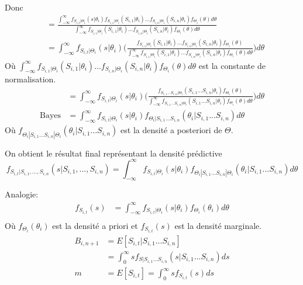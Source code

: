 \documentclass[11pt,french]{report}
\begin{document}
Donc
\begin{align*}
&= \frac{\int_{-\infty}^{\infty} f_{S_{i,t}|\Theta_i}(s|\theta_i)f_{S_{i,1}|\Theta_i}(S_{i,1}|\theta_i)...f_{S_{i,n}|\Theta_i}(S_{i,n}|\theta_i) f_{\Theta_i}(\theta)d\theta}{\int_{-\infty}^{\infty} f_{S_{i,1}|\Theta_i}(S_{i,1}|\theta_i)...f_{S_{i,n}|\Theta_i}(S_{i,n}|\theta_i) f_{\Theta_i}(\theta)d\theta}  \\
&= \int_{-\infty}^{\infty} f_{S_{i,t}|\Theta_i}(s|\theta_i) \Bigg( \frac{f_{S_{i,1}|\Theta_i}(S_{i,1}|\theta_i)...f_{S_{i,n}|\Theta_i}(S_{i,n}|\theta_i) f_{\Theta_i}(\theta)}{\int_{-\infty}^{\infty} f_{S_{i,1}|\Theta_i}(S_{i,1}|\theta_i)...f_{S_{i,n}|\Theta_i}(S_{i,n}|\theta_i) f_{\Theta_i}(\theta)d\theta} \Bigg) d\theta
\end{align*}
Où $\int_{-\infty}^{\infty} f_{S_{i,1}|\Theta_i}(S_{i,1}|\theta_i)...f_{S_{i,n}|\Theta_i}(S_{i,n}|\theta_i) f_{\Theta_i}(\theta)d\theta$ est la constante de normalisation.
\begin{align*}
&=\int_{-\infty}^{\infty} f_{S_{i,t}|\Theta_i}(s|\theta_i) \Bigg( \frac{f_{S_{i,1}...S_{i,n}|\Theta_i}(S_{i,1}...S_{i,n}|\theta_i)f_{\Theta_i}(\theta)}{\int_{-\infty}^{\infty} f_{S_{i,1}...S_{i,n}|\Theta_i}(S_{i,1}...S_{i,n}|\theta_i)f_{\Theta_i}(\theta)d\theta} \Bigg) d\theta \\
\text{Bayes} &= \int_{-\infty}^{\infty} f_{S_{i,t}|\Theta_i}(s|\theta_i) f_{\Theta_i|S_{i,1}...S_{i,n}}(\theta_i|S_{i,1}...S_{i,n}) d\theta 
\end{align*}
Où $f_{\Theta_i|S_{i,1}...S_{i,n}|\Theta_i}(\theta_i|S_{i,1}...S_{i,n})$ est la densité a posteriori de $\Theta$.

On obtient le résultat final représentant la densité prédictive
\begin{equation}
f_{S_{i,t}|S_{i,1}, ..., S_{i,n}}(s|S_{i,1}, ..., S_{i,n}) = \int_{-\infty}^{\infty} f_{S_{i,t}|\Theta_i}(s|\theta_i) f_{\Theta_i|S_{i,1}...S_{i,n}|\Theta_i}(\theta_i|S_{i,1}...S_{i,n}) d\theta
\end{equation}

Analogie:
\begin{align*}
f_{S_{i,t}}(s) &= \int_{-\infty}^{\infty} f_{S_{i,t}|\Theta_i}(s|\theta_i) f_{\Theta_i}(\theta_i) d\theta \\ 
\end{align*}
Où $f_{\Theta_i}(\theta_i)$ est la densité a priori et $f_{S_{i,t}}(s)$ est la densité marginale.
\begin{align*}
B_{i,n+1} &= E[S_{i,t}| S_{i,1}...S_{i,n}] \\
&= \int_{0}^{\infty} s f_{S|S_{i,1}...S_{i,n}}(s|S_{i,1}...S_{i,n})ds\\
m &= E[S_{i,t}] = \int_{0}^{\infty} s f_{S_{i,t}}(s)ds\\
\end{align*}
\end{document}
